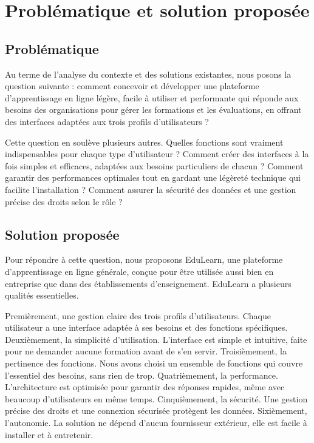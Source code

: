 \documentclass[12pt,a4paper]{report}
\begin{document}
\section{Problématique et solution proposée}

\subsection{Problématique}
Au terme de l'analyse du contexte et des solutions existantes, nous posons la question suivante : comment concevoir et développer une plateforme d'apprentissage en ligne légère, facile à utiliser et performante qui réponde aux besoins des organisations pour gérer les formations et les évaluations, en offrant des interfaces adaptées aux trois profils d'utilisateurs ?

Cette question en soulève plusieurs autres. Quelles fonctions sont vraiment indispensables pour chaque type d'utilisateur ? Comment créer des interfaces à la fois simples et efficaces, adaptées aux besoins particuliers de chacun ? Comment garantir des performances optimales tout en gardant une légèreté technique qui facilite l'installation ? Comment assurer la sécurité des données et une gestion précise des droits selon le rôle ?

\subsection{Solution proposée}
Pour répondre à cette question, nous proposons EduLearn, une plateforme d'apprentissage en ligne générale, conçue pour être utilisée aussi bien en entreprise que dans des établissements d'enseignement. EduLearn a plusieurs qualités essentielles.

Premièrement, une gestion claire des trois profils d'utilisateurs. Chaque utilisateur a une interface adaptée à ses besoins et des fonctions spécifiques.
Deuxièmement, la simplicité d'utilisation. L'interface est simple et intuitive, faite pour ne demander aucune formation avant de s'en servir.
Troisièmement, la pertinence des fonctions. Nous avons choisi un ensemble de fonctions qui couvre l'essentiel des besoins, sans rien de trop.
Quatrièmement, la performance. L'architecture est optimisée pour garantir des réponses rapides, même avec beaucoup d'utilisateurs en même temps.
Cinquièmement, la sécurité. Une gestion précise des droits et une connexion sécurisée protègent les données.
Sixièmement, l'autonomie. La solution ne dépend d'aucun fournisseur extérieur, elle est facile à installer et à entretenir.
\end{document}
